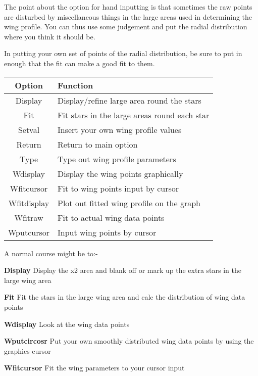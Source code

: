 {{{ The point about the option for hand inputting is that sometimes
 the raw points are disturbed by miscellaneous things in the large
 areas used in determining the wing profile. You can thus use
 some judgement and put the radial distribution where you think it
 should be.
                                                                               
 In putting your own set of points of the radial distribution, be sure
 to put in enough that the fit can make a good fit to them.
  
\begin{tabular}{|c|l|}\hline 
  Option    &    Function \\ \hline
  Display   &    Display/refine large area round the stars \\
  Fit       &    Fit stars in the large areas round each star \\
  Setval    &    Insert your own wing profile values \\
  Return    &    Return to main option \\
  Type      &    Type out wing profile parameters \\
  Wdisplay   &   Display the wing points graphically \\
  Wfitcursor  &  Fit to wing points input by cursor \\
  Wfitdisplay &  Plot out fitted wing profile on the graph \\
  Wfitraw     &  Fit to actual wing data points \\
  Wputcursor  &  Input wing points by cursor \\ \hline
\end{tabular}
                                                                
  A normal course might be to:-

\begin{list}{{-}}{}

\item {\bf Display \hspace*{2ex}} Display the x2 area and blank off or mark up
                  the extra stars in the large wing area
\item {\bf Fit \hspace*{2ex}}    Fit the stars in the large wing area and calc
                  the distribution of wing data points
\item {\bf Wdisplay \hspace*{2ex}}    Look at the wing data points
\item {\bf Wputcircosr \hspace*{2ex}}    Put your own smoothly distributed wing data
                   points by using the graphics cursor
\item {\bf Wfitcursor \hspace*{2ex}}    Fit the wing parameters to your cursor input
\end{list}
                                                                               
}}}
